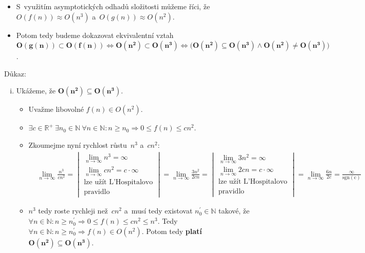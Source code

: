 \documentclass[a4paper, 11pt, fleqn]{scrartcl}
\begin{document}
	\begin{itemize}
		\item
			S~využitím asymptotických odhadů složitosti můžeme říci, že
			$ O(f(n)) \approx O(n^3) $ a~$ O(g(n)) \approx O(n^2) $.

		\item
			Potom tedy budeme dokazovat ekvivalentní vztah $ \boldsymbol{
			O(g(n)) \subset O(f(n)) \Leftrightarrow O(n^2) \subset O(n^3)
			\Leftrightarrow (O(n^2) \subseteq} \boldsymbol{O(n^3) \wedge
			O(n^2) \neq O(n^3))} $.
	\end{itemize}
	Důkaz:
	\begin{enumerate}[(i)]
		\item
			Ukážeme, že $ \boldsymbol{O(n^2) \subseteq O(n^3)} $.

			\begin{itemize}
				\item
					Uvažme libovolné $ f(n) \in O(n^2) $.

				\item
					$ \exists c \in \mathbb{R}^+\ \exists n_0 \in
					\mathbb{N}\ \forall n \in \mathbb{N} : n \geq n_0
					\Rightarrow 0 \leq f(n) \leq c n^2 $.

				\item
					Zkoumejme nyní rychlost růstu~$ n^3 $ a~$ c n^2 $:
					\begin{align*}
						& \lim_{n\to\infty} \frac{n^3}{c n^2} =
						\begin{vmatrix}
							\lim\limits_{n\to\infty} n^3 = \infty \\
							\lim\limits_{n\to\infty} c n^2 = c \cdot \infty \\
							\text{lze užít L'Hospitalovo} \\ \text{pravidlo}
						\end{vmatrix} =
						\lim_{n\to\infty} \frac{3 n^2}{2 c n} =
						\begin{vmatrix}
							\lim\limits_{n\to\infty} 3 n^2 = \infty \\
							\lim\limits_{n\to\infty} 2 c n = c \cdot \infty \\
							\text{lze užít L'Hospitalovo} \\ \text{pravidlo}
						\end{vmatrix} =
						\lim_{n\to\infty} \frac{6 n}{2 c} = \frac{\infty}{
						\mathrm{sgn(c)}}
					\end{align*}

				\item
					$ n^3 $ tedy roste rychleji než~$ c n^2 $ a~musí tedy
					existovat $ n_0^\prime \in \mathbb{N} $ takové, že
					$ \forall n \in \mathbb{N} : n \geq n_0^\prime
					\Rightarrow 0 \leq f(n) \leq c n^2 \leq n^3 $. Tedy
					$ \forall n \in \mathbb{N} : n \geq n_0^\prime
					\Rightarrow f(n) \in O(n^2) $. Potom tedy \textbf{
					platí} $ \boldsymbol{O(n^2) \subseteq O(n^3)} $.
			\end{itemize}


\end{enumerate}
\end{document}
